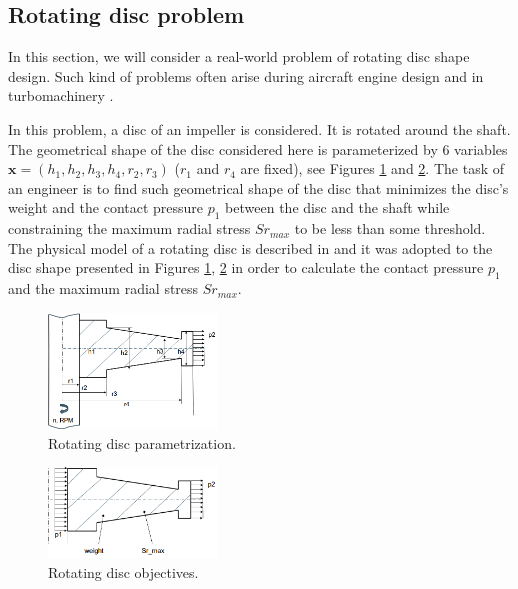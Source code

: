 \subsection{Rotating disc problem}

In this section, we will consider a real-world problem of rotating disc shape design.
Such kind of problems often arise during aircraft engine design and in turbomachinery \citep{armand1995structural}.

In this problem, a disc of an impeller is considered.
It is rotated around the shaft.
The geometrical shape of the disc considered here is parameterized by 6 variables
$\mathbf{x} = (h_1, h_2, h_3, h_4, r_2, r_3)$ ($r_1$ and $r_4$ are fixed), see Figures \ref{fig:rotating_disc_parametrization} and \ref{fig:rotating_disc_objectives}.
The task of an engineer is to find such geometrical shape of the disc that minimizes the disc's weight and the contact pressure $p_1$ between
the disc and the shaft while constraining the maximum radial stress $Sr_{max}$ to be less than some threshold.
The physical model of a rotating disc is described in \citep{armand1995structural} and it was adopted to the disc shape
presented in Figures \ref{fig:rotating_disc_parametrization}, \ref{fig:rotating_disc_objectives} in order to calculate the contact pressure $p_1$
and the maximum radial stress $Sr_{max}$.

\begin{figure}
  \centering
  \includegraphics[width=0.4\textwidth]{figures/gp_on_grid/rotating_disk_parametrization.png}
  \caption{Rotating disc parametrization.}
  \label{fig:rotating_disc_parametrization}
\end{figure}

\begin{figure}
  \centering
  \includegraphics[width=0.4\textwidth]{figures/gp_on_grid/rotating_disk_objectives.png}
  \caption{Rotating disc objectives.}
  \label{fig:rotating_disc_objectives}
\end{figure}

